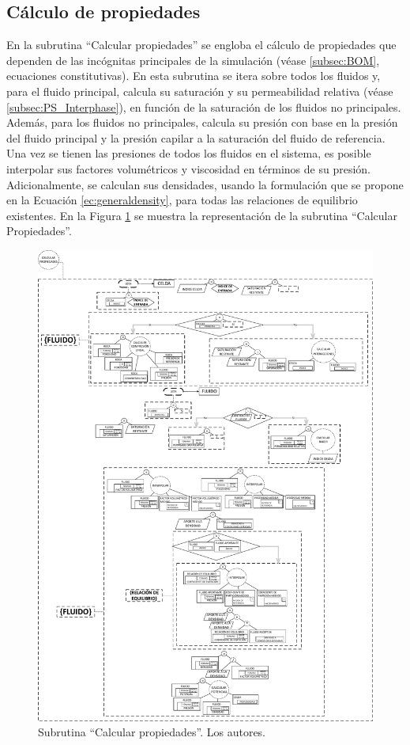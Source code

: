 \subsection{Cálculo de propiedades}\label{subsec:PS_PropertyCalc}
En la subrutina ``Calcular propiedades'' se engloba el cálculo de propiedades que dependen de las incógnitas principales de la simulación (véase \ref{subsec:BOM}, ecuaciones constitutivas). En esta subrutina se itera sobre todos los fluidos y, para el fluido principal, calcula su saturación y su permeabilidad relativa (véase \ref{subsec:PS_Interphase}), en función de la saturación de los fluidos no principales. Además, para los fluidos no principales, calcula su presión con base en la presión del fluido principal y la presión capilar a la saturación del fluido de referencia. Una vez se tienen las presiones de todos los fluidos en el sistema, es posible interpolar sus factores volumétricos y viscosidad en términos de su presión. Adicionalmente, se calculan sus densidades, usando la formulación que se propone en la Ecuación \ref{ec:generaldensity}, para todas las relaciones de equilibrio existentes.  En la Figura \ref{fig:PropertyCalculation} se muestra la representación de la subrutina ``Calcular Propiedades''.\\

\begin{figure}[h]
	\centering%
	\includegraphics[width=0.9\linewidth]{Fig/CalculoPropiedades.pdf}%
	\caption[Subrutina ``Calcular propiedades''.]{Subrutina ``Calcular propiedades''. Los autores.}
	\label{fig:PropertyCalculation}
\end{figure}


